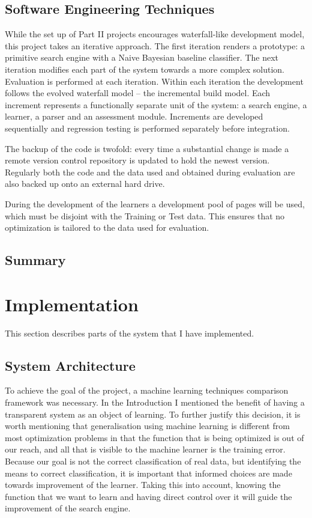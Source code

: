 \documentclass[12pt,notitlepage,twoside]{scrreprt}
\begin{document}
\section{Software Engineering Techniques}
While the set up of Part II projects encourages waterfall-like development
model, this project takes an iterative approach. The first iteration renders a
prototype: a primitive search engine with a Naive Bayesian baseline classifier.
The next iteration modifies each part of the system towards a more complex
solution. Evaluation is performed at each iteration. Within each  iteration the
development follows the evolved waterfall model -- the incremental build model.
Each increment represents a functionally separate unit of the system: a search
engine, a learner, a parser and an assessment module. Increments are developed
sequentially and regression testing is performed separately before
integration.

The backup of the code is twofold: every time a substantial change is made a remote
version control repository is updated to hold the newest version. Regularly both the code and
the data used and obtained during evaluation are also backed up onto an
external hard drive.

During the development of the learners a development pool of pages will
be used, which must be disjoint with the Training or Test data. This ensures
that no optimization is tailored to the data used for evaluation. 

\cleardoublepage

\section{Summary}
\chapter{Implementation}
This section describes parts of the system that I have implemented.

\section{System Architecture}

To achieve the goal of the project, a machine learning techniques comparison
framework was necessary. In the Introduction I mentioned the benefit of having
a transparent system as an object of learning. To further justify this
decision, it is worth mentioning that  generalisation using machine learning is
different from most optimization problems in that the function that is being
optimized is out of our reach, and all that is visible to the machine learner
is the training error. Because our goal is not the correct classification of
real data, but identifying the means to correct classification, it is important
that informed choices are made towards improvement of the learner. Taking this
into account, knowing the function that we want to learn and having direct
control over it  will guide the improvement of the search engine. 
\end{document}
